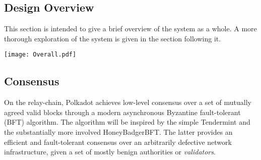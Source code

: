 \documentclass[t,usepdftitle=false]{beamer}
\newenvironment{Figure}
  {\par\medskip\noindent\minipage{\linewidth}}
  {\endminipage\par\medskip}
\newcommand{\sectionbreak}{}
\begin{document}
\begin{frame}

\section{Design Overview}\label{design-overview}

 This section is intended to give a brief overview of the system as a whole. A more thorough exploration of the system is given in the section following it.

\sectionbreak

\begin{Figure}
\centering
\vspace{-0.5\baselineskip}
\texttt{[image: Overall.pdf]}
\end{Figure}

\subsection{Consensus}\label{consensus}

 On the relay-chain, Polkadot achieves low-level consensus over a set of mutually agreed valid blocks through a modern asynchronous Byzantine fault-tolerant (BFT) algorithm. The algorithm will be inspired by the simple Tendermint\cite{kwon2014tendermint} and the substantially more involved HoneyBadgerBFT\cite{miller2016honey}. The latter provides an efficient and fault-tolerant consensus over an arbitrarily defective network infrastructure, given a set of mostly benign authorities or \emph{validators}.


\end{frame}
\end{document}
